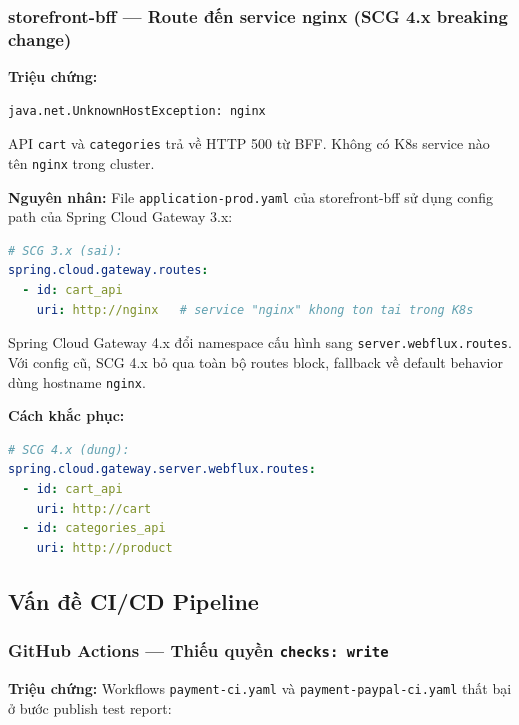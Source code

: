 \subsubsection{storefront-bff — Route đến service nginx (SCG 4.x breaking change)}

\textbf{Triệu chứng:}

\begin{lstlisting}[language=bash]
java.net.UnknownHostException: nginx
\end{lstlisting}

API \texttt{cart} và \texttt{categories} trả về HTTP 500 từ BFF. Không có K8s service nào tên \texttt{nginx} trong cluster.

\textbf{Nguyên nhân:} File \texttt{application-prod.yaml} của storefront-bff sử dụng config path của Spring Cloud Gateway 3.x:

\begin{lstlisting}[language=yaml]
# SCG 3.x (sai):
spring.cloud.gateway.routes:
  - id: cart_api
    uri: http://nginx   # service "nginx" khong ton tai trong K8s
\end{lstlisting}

Spring Cloud Gateway 4.x đổi namespace cấu hình sang \texttt{server.webflux.routes}. Với config cũ, SCG 4.x bỏ qua toàn bộ routes block, fallback về default behavior dùng hostname \texttt{nginx}.

\textbf{Cách khắc phục:}

\begin{lstlisting}[language=yaml]
# SCG 4.x (dung):
spring.cloud.gateway.server.webflux.routes:
  - id: cart_api
    uri: http://cart
  - id: categories_api
    uri: http://product
\end{lstlisting}

\subsection{Vấn đề CI/CD Pipeline}

\subsubsection{GitHub Actions — Thiếu quyền \texttt{checks: write}}

\textbf{Triệu chứng:} Workflows \texttt{payment-ci.yaml} và \texttt{payment-paypal-ci.yaml} thất bại ở bước publish test report:

